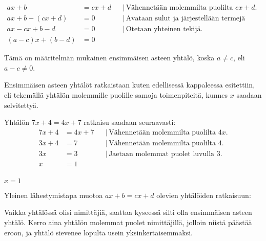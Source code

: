 \begin{align*}
ax+b &= cx+d & &| \, \text{Vähennetään molemmilta puolilta $cx+d$}. \\
ax+b - (cx+d) &= 0 & &| \, \text{Avataan sulut ja järjestellään termejä uudelleen.} \\
ax - cx + b - d &= 0 & &| \, \text{Otetaan yhteinen tekijä.} \\
(a-c)x + (b-d) &= 0 & &
\end{align*}

Tämä on määritelmän mukainen ensimmäisen asteen yhtälö, koska $a \neq c$, eli $a-c \neq 0$.

Ensimmäisen asteen yhtälöt ratkaistaan kuten edellisessä kappaleessa esitettiin, eli tekemällä yhtälön molemmille puolille  samoja toimenpiteitä, kunnes $x$ saadaan selvitettyä. 

\begin{esimerkki}
Yhtälön $7x+4=4x+7$ ratkaisu saadaan seuraavasti:
\begin{align*}
7x+4 &= 4x+7 & &| \, \text{Vähennetään molemmilta puolilta $4x$.} \\
3x+4 &= 7 & &| \, \text{Vähennetään molemmilta puolilta 4.} \\
3x &= 3 & &| \, \text{Jaetaan molemmat puolet luvulla 3.} \\
x &= 1 & & \\
\end{align*}

	\begin{esimvast}
$x=1$
	\end{esimvast}
\end{esimerkki}


\begin{esimerkki}
Yleinen lähestymistapa muotoa $ax+b = cx+d$ olevien yhtälöiden ratkaisuun:
\end{esimerkki}

Vaikka yhtälössä olisi nimittäjiä, saattaa kyseessä silti olla ensimmäisen asteen yhtälö. Kerro aina yhtälön molemmat puolet nimittäjillä, jolloin niistä päästää eroon, ja yhtälö sievenee lopulta usein yksinkertaisemmaksi.

